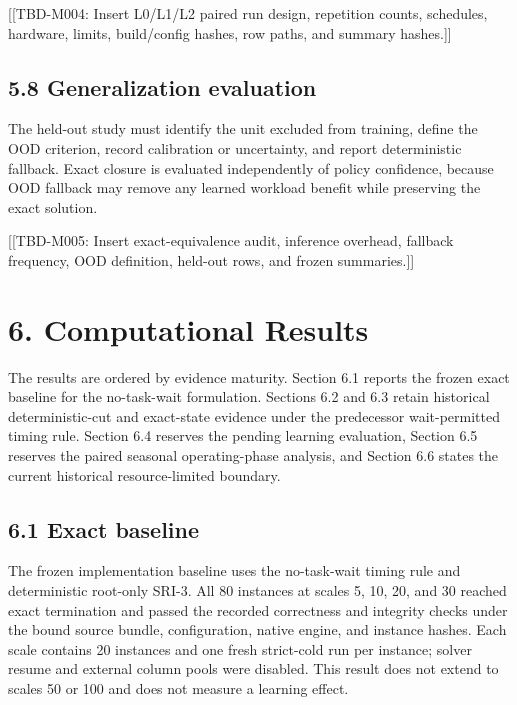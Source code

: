 \documentclass[
  11pt,
]{article}
\begin{document}
{[}{[}TBD-M004: Insert L0/L1/L2 paired run design, repetition counts,
schedules, hardware, limits, build/config hashes, row paths, and summary
hashes.{]}{]}

\hypertarget{generalization-evaluation}{%
\subsection{5.8 Generalization
evaluation}\label{generalization-evaluation}}

The held-out study must identify the unit excluded from training, define
the OOD criterion, record calibration or uncertainty, and report
deterministic fallback. Exact closure is evaluated independently of
policy confidence, because OOD fallback may remove any learned workload
benefit while preserving the exact solution.

{[}{[}TBD-M005: Insert exact-equivalence audit, inference overhead,
fallback frequency, OOD definition, held-out rows, and frozen
summaries.{]}{]}

\hypertarget{computational-results}{%
\section{6. Computational Results}\label{computational-results}}

The results are ordered by evidence maturity. Section 6.1 reports the
frozen exact baseline for the no-task-wait formulation. Sections 6.2 and
6.3 retain historical deterministic-cut and exact-state evidence under
the predecessor wait-permitted timing rule. Section 6.4 reserves the
pending learning evaluation, Section 6.5 reserves the paired seasonal
operating-phase analysis, and Section 6.6 states the current historical
resource-limited boundary.

\hypertarget{exact-baseline}{%
\subsection{6.1 Exact baseline}\label{exact-baseline}}

The frozen implementation baseline uses the no-task-wait timing rule and
deterministic root-only SRI-3. All 80 instances at scales 5, 10, 20, and
30 reached exact termination and passed the recorded correctness and
integrity checks under the bound source bundle, configuration, native
engine, and instance hashes. Each scale contains 20 instances and one
fresh strict-cold run per instance; solver resume and external column
pools were disabled. This result does not extend to scales 50 or 100 and
does not measure a learning effect.
\end{document}
